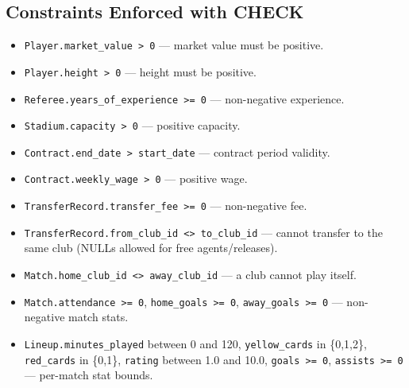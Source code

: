 \documentclass[12pt]{article}
\begin{document}
\subsection{Constraints Enforced with CHECK}
\begin{itemize}[leftmargin=*]
    \item \texttt{Player.market\_value > 0} --- market value must be positive.
    \item \texttt{Player.height > 0} --- height must be positive.
    \item \texttt{Referee.years\_of\_experience >= 0} --- non-negative experience.
    \item \texttt{Stadium.capacity > 0} --- positive capacity.
    \item \texttt{Contract.end\_date > start\_date} --- contract period validity.
    \item \texttt{Contract.weekly\_wage > 0} --- positive wage.
    \item \texttt{TransferRecord.transfer\_fee >= 0} --- non-negative fee.
    \item \texttt{TransferRecord.from\_club\_id <> to\_club\_id} --- cannot transfer to the same club (NULLs allowed for free agents/releases).
    \item \texttt{Match.home\_club\_id <> away\_club\_id} --- a club cannot play itself.
    \item \texttt{Match.attendance >= 0}, \texttt{home\_goals >= 0}, \texttt{away\_goals >= 0} --- non-negative match stats.
    \item \texttt{Lineup.minutes\_played} between 0 and 120, \texttt{yellow\_cards} in \{0,1,2\}, \texttt{red\_cards} in \{0,1\}, \texttt{rating} between 1.0 and 10.0, \texttt{goals >= 0}, \texttt{assists >= 0} --- per-match stat bounds.
\end{itemize}
\end{document}
